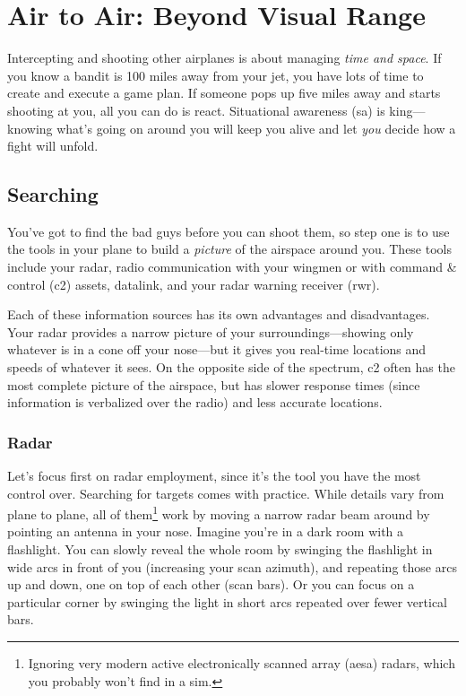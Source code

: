\chapter{Air to Air: Beyond Visual Range}

Intercepting and shooting other airplanes is about managing \emph{time and space}.
If you know a bandit is 100 miles away from your jet,
you have lots of time to create and execute a game plan.
If someone pops up five miles away and starts shooting at you,
all you can do is react.
Situational awareness \ac{(sa)} is king---knowing what's going on around
you will keep you alive and let \emph{you} decide how a fight will unfold.

\section{Searching}

You've got to find the bad guys before you can shoot them,
so step one is to use the tools in your plane to build a \emph{picture}
of the airspace around you.
These tools include your radar,
radio communication with your wingmen or with
command \& control \ac{(c2)} assets, datalink,
and your radar warning receiver \ac{(rwr)}.

Each of these information sources has its own advantages and disadvantages.
Your radar provides a narrow picture of your surroundings---showing
only whatever is in a cone off your nose---but it gives you
real-time locations and speeds of whatever it sees.
On the opposite side of the spectrum,
\ac{c2} often has the most complete picture of the airspace,
but has slower response times (since information is verbalized over the radio)
and less accurate locations.

\subsection{Radar}

Let's focus first on radar employment,
since it's the tool you have the most control over.
Searching for targets comes with practice.
While details vary from plane to plane,
all of them\footnote{Ignoring very modern active electronically scanned array
\ac{(aesa)} radars, which you probably won't find in a sim.}
work by moving a narrow radar beam around by pointing an antenna in your nose.
Imagine you're in a dark room with a flashlight.
You can slowly reveal the whole room by swinging the flashlight in wide arcs
in front of you (increasing your scan azimuth),
and repeating those arcs up and down, one on top of each other
(scan bars).
Or you can focus on a particular corner by swinging the light in short arcs
repeated over fewer vertical bars.


